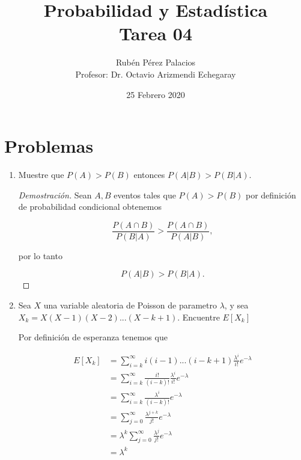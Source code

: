 \documentclass[letterpaper]{article}
\title{Probabilidad y Estadística\\Tarea 04}
\author{Rubén Pérez Palacios\\Profesor: Dr. Octavio Arizmendi Echegaray}
\date{25 Febrero 2020}
\theoremstyle{definition}
\theoremstyle{definition}
\begin{document}
\maketitle

\section*{Problemas}

\begin{enumerate}
    
    \item Muestre que $P(A) > P(B)$ entonces $P(A|B) > P(B|A)$.
        
    \begin{proof}[Demostración]
        Sean $A, B$ eventos tales que $P(A) > P(B)$ por definición de probabilidad condicional obtenemos

        \[\frac{P(A\cap B)}{P(B|A)} > \frac{P(A\cap B)}{P(A|B)},\]

        por lo tanto

        \[{P(A|B)} > {P(B|A)}.\]

    \end{proof}

    \item Sea $X$ una variable aleatoria de Poisson de parametro $\lambda$, y sea $X_k = X(X - 1)(X - 2)...(X - k + 1)$. Encuentre $E[X_k]$
    
    Por definición de esperanza tenemos que

    \begin{align*}
        E[X_k] &= \sum_{i=k}^{\infty} i(i-1)...(i-k+1) \frac{\lambda ^ i}{i!} e^{-\lambda}\\
        &= \sum_{i=k}^{\infty} \frac{i!}{(i-k)!} \frac{\lambda ^ i}{i!} e^{-\lambda}\\
        &= \sum_{i=k}^{\infty} \frac{\lambda^i}{(i-k)!} e^{-\lambda}\\
        &= \sum_{j=0}^{\infty} \frac{\lambda^{j+k}}{j!} e^{-\lambda}\\
        &= \lambda^k \sum_{j=0}^{\infty} \frac{\lambda^j}{j!} e^{-\lambda}\\
        &= \lambda^k
    \end{align*}

\end{enumerate}
\end{document}
